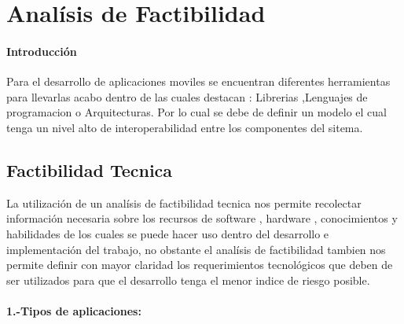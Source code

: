 \section{Analísis de Factibilidad}
\paragraph{Introducción}
Para el desarrollo de aplicaciones moviles se encuentran diferentes herramientas para llevarlas acabo dentro de las cuales destacan :
Librerias ,Lenguajes de programacion o Arquitecturas.
Por lo cual se debe de definir un modelo el cual tenga un nivel alto de interoperabilidad entre los componentes del sitema.


\subsection{Factibilidad Tecnica}
La utilización de un analísis de factibilidad tecnica nos permite recolectar información necesaria sobre los recursos de software , hardware , conocimientos y habilidades de los cuales se puede hacer uso dentro del desarrollo e implementación del trabajo, no obstante el analísis de factibilidad tambien nos permite definir con mayor claridad los requerimientos tecnológicos que deben de ser utilizados para que el desarrollo tenga el menor indice de riesgo posible.


\paragraph{1.-Tipos de aplicaciones:}

